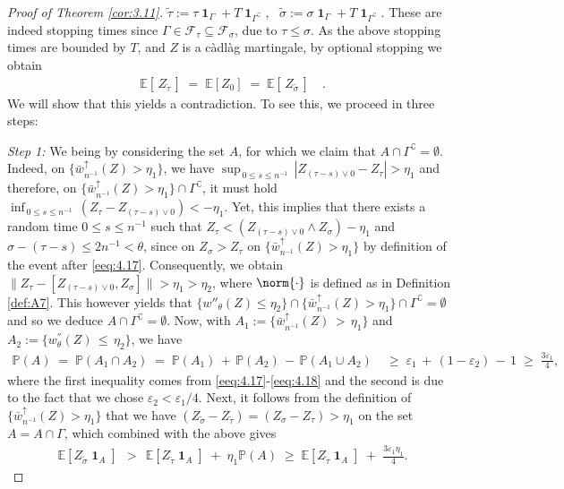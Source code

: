 \documentclass[11pt]{article}
\theoremstyle{definition}\newtheorem{example}[theorem]{Example}
\theoremstyle{definition}\newtheorem{counterexample}[theorem]{Counterexample}
\theoremstyle{definition}\newtheorem{remark}[theorem]{Remark}
\theoremstyle{definition}\newtheorem{defi}[theorem]{Definition}
\numberwithin{equation}{section}
\newcommand{\E}{\mathbb{E}}											%
\newcommand{\Pro}{\mathbb{P}}										%
\newcommand{\ind}{\operatorname{\mathbf{1}}}							%
\renewcommand{\|}{\; : \, \;}											%
\begin{document}
\begin{proof}[Proof of Theorem \ref{cor:3.11}]
	$\tilde{\tau} := \tau \ind_{\Gamma}  +  T  \ind_{\Gamma^\complement}$, \, $\tilde{\sigma} := \sigma \ind_{\Gamma}  +  T \ind_{\Gamma^\complement}$. These are indeed stopping times since $\Gamma \in \mathcal{F}_\tau \subseteq \mathcal{F}_\sigma$, due to $\tau\le \sigma$. As the above stopping times are bounded by $T$, and $Z$ is a càdlàg martingale, by optional stopping we obtain 
	\begin{align} \E [ \, Z_{\tilde\tau} \, ] \; = \; \E[Z_0] \; = \;  \E \left[ \, Z_{ \tilde \sigma} \, \right] \quad . \label{eeq:4.19} \end{align}
	We will show that this yields a contradiction. To see this, we proceed in three steps:
	
\emph{Step 1:} We being by considering the set $A$, for which we claim that $A\cap \Gamma^\complement=\emptyset$. Indeed, on $\{ \bar w^{\uparrow}_{n^{-1}}(Z) > \eta_1 \}$, we have $\operatorname{sup}_{\, 0\le s \le n^{-1}} \, |Z_{(\tau-s)\vee 0}-Z_{\tau}| >  \eta_1$ and therefore, on $\{ \bar w^{\uparrow}_{n^{-1}}(Z) > \eta_1 \}\cap \Gamma^\complement$, it must hold $\operatorname{inf}_{\, 0\le s \le n^{-1}} \, (Z_{\tau}-Z_{(\tau-s)\vee 0}) <  -\eta_1$. Yet, this implies that there exists a random time $0\le s \le n^{-1}$ such that $Z_\tau < (Z_{(\tau-s)\vee 0}\wedge Z_{\sigma})-\eta_1$ and $\sigma-(\tau-s)\le 2n^{-1}<\theta$, since on $Z_\sigma>Z_\tau$ on $\{ \bar w^{\uparrow}_{n^{-1}}(Z) > \eta_1 \}$ by definition of the event after \eqref{eeq:4.17}. Consequently, we obtain $\lVert Z_{\tau} - [ Z_{(\tau-s)\vee 0}, Z_{\sigma}] \rVert > \eta_1 > \eta_2$, where $\norm{\cdot}$ is defined as in Definition \ref{def:A7}. This however yields that $\{w''_\theta(Z)\le \eta_2\} \cap \{ \bar w^{\uparrow}_{n^{-1}}(Z) > \eta_1 \}\cap \Gamma^\complement=\emptyset$ and so we deduce $A\cap \Gamma^\complement=\emptyset$. Now, with $A_1:=\{ \bar{w}^{\uparrow}_{n^{-1}}(Z)\, > \, \eta_1 \}$ and $A_2:=\{w^{''}_{\theta}(Z) \, \le \, \eta_2 \}$, we have
		\begin{align*} \Pro(A) \;= \; \Pro(A_1 \cap A_2) \; = \; \Pro(A_1) \, + \, \Pro(A_2) \, - \, \Pro(A_1\cup A_2) \; &\ge \; \varepsilon_1 \, + \, (1-\varepsilon_2) \, - \, 1 \; \ge \; \frac{3\varepsilon_1}{4},
		\end{align*} where the first inequality comes from \eqref{eeq:4.17}-\eqref{eeq:4.18} and the second is due to the fact that we chose $\varepsilon_2< \varepsilon_1/4$. Next, it follows from the definition of $\{ \bar w^{\uparrow}_{n^{-1}}(Z) > \eta_1 \}$ that we have $(Z_{\tilde\sigma}-Z_{\tilde\tau})=(Z_{\sigma}-Z_{\tau})>\eta_1$ on the set $A=A\cap \Gamma$, which combined with the above gives
		\begin{align} \E[ Z_{\tilde \sigma} \ind_A] \; \, > \, \; \E[ Z_{\tilde\tau} \ind_A] \; + \; \eta_1 \Pro(A) \; \ge \; \E[ Z_{\tilde\tau} \ind_A] \; + \; \frac{3\varepsilon_1\eta_1}{4}. \label{eeq:4.20} \end{align}
		

\end{proof}
\end{document}
